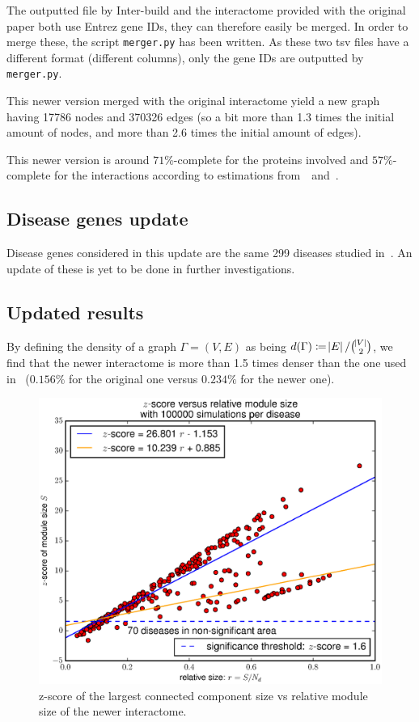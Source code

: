\documentclass[letterpaper]{article}
\begin{document}
	The outputted file by Inter-build and the interactome provided with the original paper both use Entrez gene IDs, they
	can therefore easily be merged. In order to merge these, the script \texttt{merger.py} has been written. As these two
	tsv files have a different format (different columns), only the gene IDs are outputted by \texttt{merger.py}.

	This newer version merged with the original interactome yield a new graph having 17786 nodes and 370326 edges
	(so a bit more than 1.3 times the initial amount of nodes, and more than 2.6 times the initial amount of edges).

	This newer version is around $71\%$-complete for the proteins involved and $57\%$-complete for the interactions according
	to estimations from~\cite{estimatingTheSizeOfTheHumanInteractome}~and~\cite{ATruerMeasureOfOurIgnorance}.

	\subsection{Disease genes update}
	Disease genes considered in this update are the same 299 diseases studied in~\cite{originalPaper}. An update of these
	is yet to be done in further investigations.

	\subsection{Updated results}
	By defining the density of a graph $\Gamma = (V, E)$ as being $d(\Gamma) \coloneqq \abs E/\binom {\abs V}2$,
	we find that the newer interactome is more than 1.5 times denser than the one used in~\cite{originalPaper} ($0.156\%$
	for the original one versus $0.234\%$ for the newer one).

	\begin{figure}[!h]
		\includegraphics[width=.5\textwidth]{images/new_interactome_S4.b100000.eps}
		\caption{z-score of the largest connected component size vs relative module size of the newer interactome.
		\label{fig:new interactome zscore}}
	\end{figure}
\end{document}
